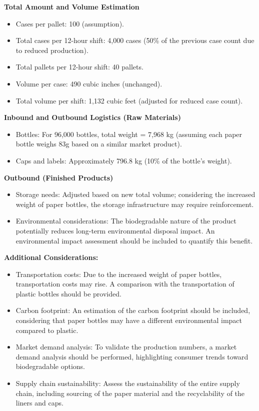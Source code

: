 \documentclass{article}
\begin{document}
\textbf{Total Amount and Volume Estimation}
\begin{itemize}
    \item Cases per pallet: 100 (assumption).
    \item Total cases per 12-hour shift: 4,000 cases (50\% of the previous case count due to reduced production).
    \item Total pallets per 12-hour shift: 40 pallets.
    \item Volume per case: 490 cubic inches (unchanged).
    \item Total volume per shift: 1,132 cubic feet (adjusted for reduced case count).
\end{itemize}

\textbf{Inbound and Outbound Logistics (Raw Materials)}
\begin{itemize}
    \item Bottles: For 96,000 bottles, total weight = 7,968 kg (assuming each paper bottle weighs 83g based on a similar market product).
    \item Caps and labels: Approximately 796.8 kg (10\% of the bottle's weight).
\end{itemize}

\textbf{Outbound (Finished Products)}
\begin{itemize}
    \item Storage needs: Adjusted based on new total volume; considering the increased weight of paper bottles, the storage infrastructure may require reinforcement.
    \item Environmental considerations: The biodegradable nature of the product potentially reduces long-term environmental disposal impact. An environmental impact assessment should be included to quantify this benefit.
\end{itemize}

\textbf{Additional Considerations:}
\begin{itemize}
    \item Transportation costs: Due to the increased weight of paper bottles, transportation costs may rise. A comparison with the transportation of plastic bottles should be provided.
    \item Carbon footprint: An estimation of the carbon footprint should be included, considering that paper bottles may have a different environmental impact compared to plastic.
    \item Market demand analysis: To validate the production numbers, a market demand analysis should be performed, highlighting consumer trends toward biodegradable options.
    \item Supply chain sustainability: Assess the sustainability of the entire supply chain, including sourcing of the paper material and the recyclability of the liners and caps.
\end{itemize}
\end{document}
